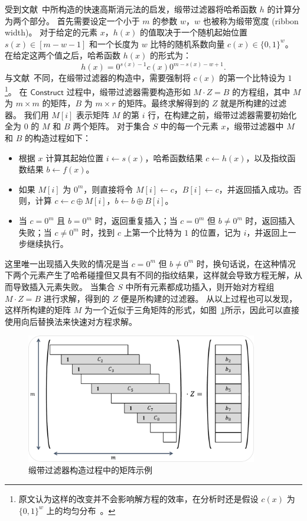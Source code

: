 受到文献~\cite{dietzfelbinger2019Efficient}中所构造的快速高斯消元法的启发，缎带过滤器将哈希函数 $h$ 的计算分为两个部分。
首先需要设定一个小于 $m$ 的参数 $w$，$w$ 也被称为缎带宽度 (ribbon width)。
对于给定的元素 $x$，$h(x)$ 的值取决于一个随机起始位置 $s(x)\in [m-w-1]$ 和一个长度为 $w$ 比特的随机系数向量 $c(x) \in \{0,1\}^w$。
在给定这两个值之后，哈希函数 $h(x)$ 的形式为：
\begin{equation}
  h(x) = 0^{s(x)-1}c(x)0^{m-s(x)-w+1}.
\end{equation}
与文献~\cite{dietzfelbinger2019Efficient}不同，在缎带过滤器的构造中，需要强制将 $c(x)$ 的第一个比特设为 $1$\footnote{原文认为这样的改变并不会影响解方程的效率，在分析时还是假设 $c(x)$ 为 $\{0,1\}^w$ 上的均匀分布~\cite{dillinger2021ribbon}。}。
在 $\mathsf{Construct}$ 过程中，缎带过滤器需要构造形如 $M \cdot Z = B$ 的方程组，其中 $M$ 为 $m\times m$ 的矩阵，$B$ 为 $m\times r$ 的矩阵。最终求解得到的 $Z$ 就是所构建的过滤器。
我们用 $M[i]$ 表示矩阵 $M$ 的第 $i$ 行，在构建之前，缎带过滤器需要初始化全为 $0$ 的 $M$ 和 $B$ 两个矩阵。
对于集合 $S$ 中的每一个元素 $x$，缎带过滤器中 $M$ 和 $B$ 的构造过程如下：
\begin{itemize}
  \item 根据 $x$ 计算其起始位置 $i\gets s(x)$，哈希函数结果 $c \gets h(x)$，以及指纹函数结果 $b \gets f(x)$。
  \item 如果 $M[i]$ 为 $0^{m}$，则直接将令 $M[i] \gets c$，$B[i] \gets c$，并返回插入成功。否则，计算 $c \gets c \oplus M[i]$，$b \gets b \oplus B[i]$。
  \item 当 $c=0^{m}$ 且 $b = 0^{m}$ 时，返回重复插入；当 $c=0^{m}$ 但 $b \neq 0^{m}$ 时，返回插入失败；当 $c\neq 0^{m}$ 时，找到 $c$ 上第一个比特为 $1$ 的位置，记为 $i$，并返回上一步继续执行。
\end{itemize}
这里唯一出现插入失败的情况是当 $c=0^{m}$ 但 $b\neq 0^{m}$ 时，换句话说，在这种情况下两个元素产生了哈希碰撞但又具有不同的指纹结果，这样就会导致方程无解，从而导致插入元素失败。
当集合 $S$ 中所有元素都成功插入，则开始对方程组 $M \cdot Z = B$ 进行求解，得到的 $Z$ 便是所构建的过滤器。
从以上过程也可以发现，这样所构建的矩阵 $M$ 为一个近似于三角矩阵的形式，如图~\ref{fig:ribbon_construc}所示，因此可以直接使用向后替换法来快速对方程求解。

\begin{figure}[ht]
  \centering
  \includegraphics[width=0.9\textwidth]{figures/ribbon_exp.pdf}
  \caption{缎带过滤器构造过程中的矩阵示例}
  \label{fig:ribbon_construc}
\end{figure}

